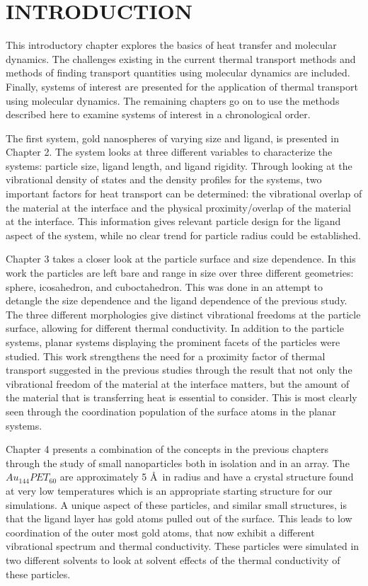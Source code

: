 \chapter{INTRODUCTION}\label{chap:intro}
This introductory chapter explores the basics of heat transfer and molecular dynamics. The challenges existing in the current thermal transport methods and methods of finding transport quantities using molecular dynamics are included. Finally, systems of interest are presented for the application of thermal transport using molecular dynamics. The remaining chapters go on to use the methods described here to examine systems of interest in a chronological order.

The first system, gold nanospheres of varying size and ligand, is presented in Chapter 2.  The system looks at three different variables to characterize the systems: particle size, ligand length, and ligand rigidity. Through looking at the vibrational density of states and the density profiles for the systems, two important factors for heat transport can be determined: the vibrational overlap of the material at the interface and the physical proximity/overlap of the material at the interface. This information gives relevant particle design for the ligand aspect of the system, while no clear trend for particle radius could be established. 

Chapter 3 takes a closer look at the particle surface and size dependence. In this work the particles are left bare and range in size over three different geometries: sphere, icosahedron, and cuboctahedron. This was done in an attempt to detangle the size dependence and the ligand dependence of the previous study. The three different morphologies give  distinct vibrational freedoms at the particle surface, allowing for different thermal conductivity. In addition to the particle systems, planar systems displaying the prominent facets of the particles were studied. This work strengthens the need for a proximity factor of thermal transport suggested in the previous studies through the result that not only the vibrational freedom of the material at the interface matters, but the amount of the material that is transferring heat is essential to consider. This is most clearly seen through the coordination population of the surface atoms in the planar systems.

Chapter 4 presents a combination of the concepts in the previous chapters through the study of small nanoparticles both in isolation and in an array. The $Au_{144}PET_{60}$ are approximately 5 \AA\ in radius and have a crystal structure found at very low temperatures which is an appropriate starting structure for our simulations. A unique aspect of these particles, and similar small structures, is that the ligand layer has gold atoms pulled out of the surface. This leads to low coordination of the outer most gold atoms, that now exhibit a different vibrational spectrum and thermal conductivity. These particles were simulated in two different solvents to look at solvent effects of the thermal conductivity of these particles.

